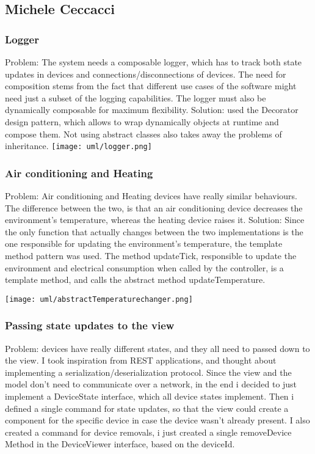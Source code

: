 \subsection{Michele Ceccacci}

\subsubsection{Logger} 
Problem: The system needs a composable logger, which has to track both state updates in devices and connections/disconnections
of devices. The need for composition stems from the fact that different use cases of the software might need just a subset
of the logging capabilities. The logger must also be dynamically composable for maximum flexibility.
Solution: used the Decorator design pattern, which allows to wrap dynamically objects at runtime and compose them.
Not using abstract classes also takes away the problems of inheritance. \newline
\texttt{[image: uml/logger.png]}

\subsubsection{Air conditioning and Heating}
Problem: 
Air conditioning and Heating devices have really similar behaviours. The difference between the two, is that an air conditioning
device decreases the environment's temperature, whereas the heating device raises it.
Solution: Since the only function that actually changes between the two implementations is the one responsible for updating the
environment's temperature, the template method pattern was used. 
The method updateTick, responsible to update the environment and electrical consumption when called by the controller,
is a template method, and calls the abstract method updateTemperature. \newline

\texttt{[image: uml/abstractTemperaturechanger.png]}

\subsubsection{Passing state updates to the view}
Problem: devices have really different states, and they all need to passed down to the view.
I took inspiration from REST applications, and thought about implementing a  serialization/deserialization protocol.
Since the view and the model don't need to communicate over a network, in the end i decided to just implement a DeviceState interface, 
which all device states implement.
Then i defined a single command for state updates, so that the view could create a component for the specific device in case
the device wasn't already present. I also created a command for device removals, i just created a single removeDevice Method in the DeviceViewer interface, 
based on the deviceId. \newline %
